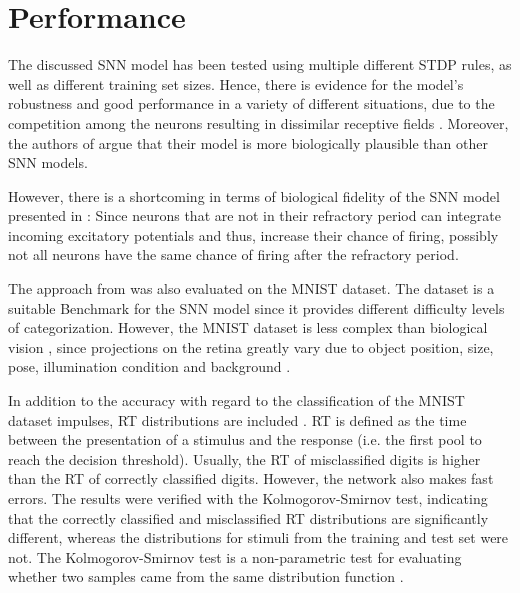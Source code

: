 \section{Performance}
\label{sec:result}

The discussed \ac{SNN} model has been tested using multiple different \ac{STDP} rules, as well as different training set sizes. 
Hence, there is evidence for the model's robustness and good performance in a variety of different situations, 
due to the competition among the neurons resulting in dissimilar receptive fields \cite{SNN}.
Moreover, the authors of \cite{SNN} argue that their model is more biologically plausible than other \ac{SNN} models.

However, there is a shortcoming in terms of biological fidelity of the \ac{SNN} model presented in \cite{SNN}:
Since neurons that are not in their refractory period can integrate incoming excitatory potentials and thus, 
increase their chance of firing, possibly not all neurons have the same chance of firing after the refractory period.

The approach from \cite{STDP_like} was also evaluated on the MNIST dataset.
The dataset is a suitable Benchmark for the \ac{SNN} model 
since it provides different difficulty levels of categorization.
However, the MNIST dataset is less complex than biological vision \cite{STDP_like}, 
since projections on the retina greatly vary due to object position, size, pose, illumination condition and background \cite{multi_scale_STDP}.

In addition to the accuracy with regard to the classification of the MNIST dataset impulses, \ac{RT} distributions are included \cite{STDP_like}.
\ac{RT} is defined as the time between the presentation of a stimulus and the response (i.e. the first pool to reach the decision threshold).
Usually, the \ac{RT} of misclassified digits is higher than the \ac{RT} of correctly classified digits.
However, the network also makes fast errors.
The results were verified \cite{STDP_like} with the Kolmogorov-Smirnov test, 
indicating that the correctly classified and misclassified \ac{RT} distributions are significantly different, 
whereas the distributions for stimuli from the training and test set were not.
The Kolmogorov-Smirnov test is a non-parametric test for evaluating whether two samples came from the same distribution function \cite{Kolmogorov_Smirnov}.

